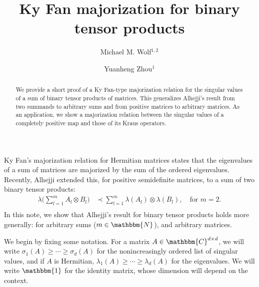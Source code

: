 \documentclass[12pt,reqno]{amsart}
\newcommand{\C}{\mathbbm{C}}
\newcommand{\N}{\mathbbm{N}}
\newcommand{\1}{\mathbbm{1}}
\begin{document}
\title{Ky Fan majorization for binary tensor products}



\author[Wolf]{Michael M. Wolf$^{1,2}$}
\address{$^1$ Department of Mathematics, Technical University of Munich}
\address{$^2$ Munich Center for Quantum
Science and Technology (MCQST),  Munich, Germany}
\author[Zhou]{Yuanheng Zhou$^{1}$}





\begin{abstract} We provide a short proof of a Ky Fan-type majorization relation for the singular values of a sum of binary tensor products of matrices. This generalizes Alhejji's result \cite{Alhejji2025} from two summands to arbitrary sums and from positive matrices to arbitrary matrices. As an application, we show a majorization relation between the singular values of a completely positive map and those of its Kraus operators.
\end{abstract}
\maketitle

 Ky Fan's majorization relation for Hermitian matrices \cite[Ch.\,9]{MOmajo} states that the eigenvalues of a sum of matrices are majorized by the sum of the ordered eigenvalues. Recently, Alhejji  \cite{Alhejji2025} extended this, for positive semidefinite matrices, to a sum of two binary tensor products:
\begin{equation}\label{eq:intro}
    \begin{aligned}
    \lambda\Big(\sum_{l=1}^m A_l\otimes B_l\Big)&\prec\sum_{l=1}^m \lambda(A_l)\otimes\lambda(B_l),\quad \text{for }m=2.\\
\end{aligned}
\end{equation}
In this note, we show that Alhejji's result for binary tensor products holds more generally: for arbitrary sums ($m\in\N$), and arbitrary  matrices. \vspace*{4pt}    




    

We begin by fixing some notation.
For a matrix $A\in\C^{d\times d}$, we will write $\sigma_1(A)\geq\cdots\geq\sigma_d(A)$ for the nonincreasingly ordered list of singular values, and if $A$ is Hermitian, $\lambda_1(A)\geq\cdots\geq\lambda_d(A)$ for the eigenvalues.  We will write $\1$ for the identity matrix, whose dimension will depend on the context.
\end{document}
